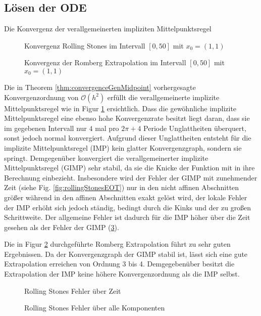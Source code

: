 \subsection{Lösen der ODE}
Die Konvergenz der verallgemeinerten impliziten Mittelpunktsregel 
\begin{figure}
\centering

\caption{Konvergenz Rolling Stones im Intervall $[0,50]$ mit $x_0=(1,1)$}
\label{fig:rollingStonesConvergence}
\end{figure}

\begin{figure}
\centering

\caption{Konvergenz der Romberg Extrapolation im Intervall $[0,50]$ mit $x_0=(1,1)$}
\label{fig:rollingStonesConvergenceRomberg}
\end{figure}

Die in Theorem \ref{thm:convergenceGenMidpoint} vorhergesagte Konvergenzordnung von $\mathcal O(h^2)$ erfüllt die verallgemeinerte implizite Mittelpunktsregel wie in Figur \ref{fig:rollingStonesConvergence} ersichtlich.
Dass die gewöhnliche implizite Mittelpunktsregel eine ebenso hohe Konvergenzrate besitzt liegt daran, dass sie im gegebenen Intervall nur $4$ mal pro $2\pi+4$ Periode Unglattheiten überquert, sonst jedoch normal konvergiert. Aufgrund dieser Unglattheiten entsteht für die implizite Mittelpunktsregel (IMP) kein glatter Konvergenzgraph, sondern sie springt. Demgegenüber konvergiert die verallgemeinerter implizite Mittelpunktsregel (GIMP) sehr stabil, da sie die Knicke der Funktion mit in ihre Berechnung einbezieht.
Insbesondere wird der Fehler der GIMP mit zunehmender Zeit (siehe Fig. \ref{fig:rollingStonesEOT}) nur in den nicht affinen Abschnitten größer während in den affinen Abschnitten exakt gelöst wird, der lokale Fehler der IMP erhöht sich jedoch ständig, bedingt durch die Kinks und der zu großen Schrittweite. Der allgemeine Fehler ist dadurch für die IMP höher über die Zeit gesehen als der Fehler der GIMP (\ref{fig:rollingStonesEOTAll}).

Die in Figur \ref{fig:rollingStonesConvergenceRomberg} durchgeführte Romberg Extrapolation führt zu sehr guten Ergebnissen. Da der Konvergenzgraph der GIMP stabil ist, lässt sich eine gute Extrapolation erreichen von Ordnung 3 bis 4. Demgegebenüber besitzt die Extrapolation der IMP keine höhere Konvergenzordnung als die IMP selbst.
\begin{figure}[H]
\centering
\begin{minipage}[b]{0.49\linewidth}

\caption{Rolling Stones Fehler über Zeit}
\label{fig:rollingStonesEOT}
\end{minipage}
\begin{minipage}[b]{0.49\linewidth}

\caption{Rolling Stones Fehler über alle Komponenten}
\label{fig:rollingStonesEOTAll}
\end{minipage}
\end{figure}

